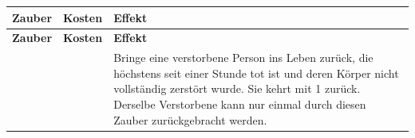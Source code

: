
\begingroup
\hplongtablestyle
\begin{xltabular}{\linewidth}{L{3.4cm} C{2.1cm} Y}
\textbf{Zauber} & \textbf{Kosten} & \textbf{Effekt} \\
\hline
\endfirsthead
\textbf{Zauber} & \textbf{Kosten} & \textbf{Effekt} \\
\hline
\endhead
{} &  & Bringe eine verstorbene Person ins Leben zurück, die höchstens seit einer Stunde tot ist und deren Körper nicht vollständig zerstört wurde. Sie kehrt mit 1\lifeGain{} zurück. Derselbe Verstorbene kann nur einmal durch diesen Zauber zurückgebracht werden. \\
\end{xltabular}
\endgroup
